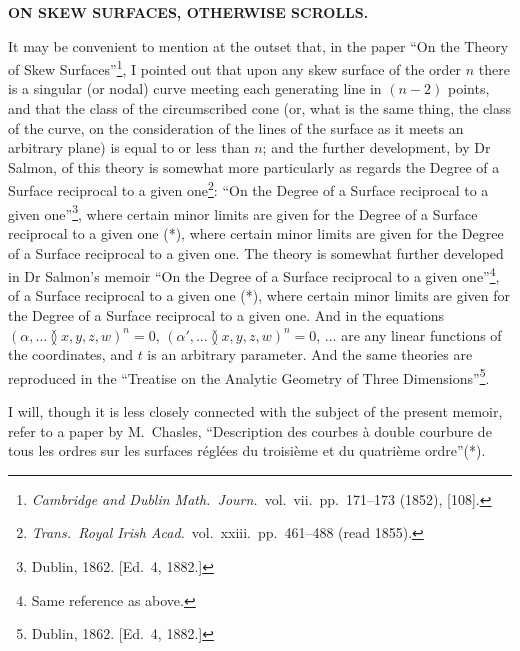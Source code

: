 \documentclass[11pt,a4paper]{article}
\begin{document}
\begin{center}
\textbf{ON SKEW SURFACES, OTHERWISE SCROLLS.}
\end{center}


\bigskip

\noindent It may be convenient to mention at the outset that, in the paper ``On the Theory of Skew Surfaces''\footnote{\textit{Cambridge and Dublin Math.\ Journ.}\ vol.\ vii.\ pp.\ 171--173 (1852), [108].}, I pointed out that upon any skew surface of the order $n$ there is a singular (or nodal) curve meeting each generating line in $(n-2)$ points, and that the class of the circumscribed cone (or, what is the same thing, the class of the curve, on the consideration of the lines of the surface as it meets an arbitrary plane) is equal to or less than $n$; and the further development, by Dr Salmon, of this theory is somewhat more particularly as regards the Degree of a Surface reciprocal to a given one\footnote{\textit{Trans.\ Royal Irish Acad.}\ vol.\ xxiii.\ pp.\ 461--488 (read 1855).}: ``On the Degree of a Surface reciprocal to a given one''\footnote{Dublin, 1862. [Ed.\ 4, 1882.]}, where certain minor limits are given for the Degree of a Surface reciprocal to a given one (*), where certain minor limits are given for the Degree of a Surface reciprocal to a given one. The theory is somewhat further developed in Dr Salmon's memoir ``On the Degree of a Surface reciprocal to a given one''\footnote{Same reference as above.}, of a Surface reciprocal to a given one (*), where certain minor limits are given for the Degree of a Surface reciprocal to a given one. And in the equations $(\alpha, \ldots\!\between\! x, y, z, w)^n=0$, $(\alpha', \ldots\!\between\! x, y, z, w)^n=0$, $\ldots$ are any linear functions of the coordinates, and $t$ is an arbitrary parameter. And the same theories are reproduced in the ``Treatise on the Analytic Geometry of Three Dimensions''\footnote{Dublin, 1862. [Ed.\ 4, 1882.]}.

\bigskip

\noindent I will, though it is less closely connected with the subject of the present memoir, refer to a paper by M.\ Chasles, ``Description des courbes \`{a} double courbure de tous les ordres sur les surfaces r\'{e}gl\'{e}es du troisi\`{e}me et du quatri\`{e}me ordre''(*).
\end{document}
